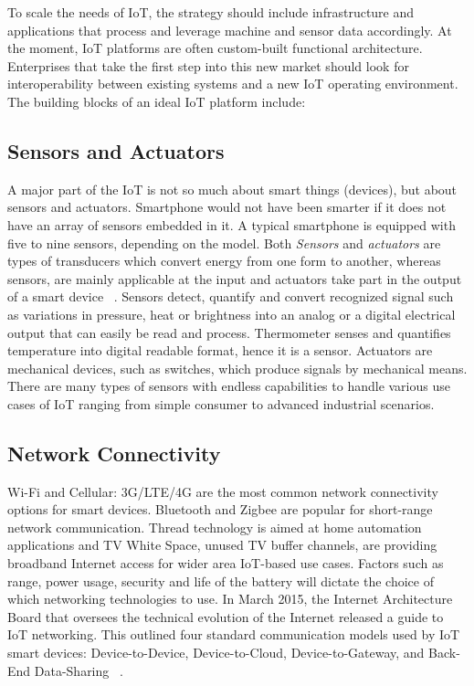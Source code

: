 \documentclass[sigconf]{acmart}
\begin{document}
	To scale the needs of IoT, the strategy should include infrastructure and applications that process and leverage machine and sensor data accordingly. At the moment, IoT platforms are often custom-built functional architecture. Enterprises that take the first step into this new market should look for interoperability between existing systems and a new IoT operating environment. The building blocks of an ideal IoT platform include:
	
	\subsection{Sensors and Actuators}
	A major part of the IoT is not so much about smart things (devices), but about sensors and actuators. Smartphone would not have been smarter if it does not have an array of sensors embedded in it. A typical smartphone is equipped with five to nine sensors, depending on the model. Both {\em Sensors} and  {\em actuators} are types of transducers which convert energy from one form to another, whereas sensors, are mainly applicable at the input and actuators take part in the output of a smart device ~\cite{wiley-book}. Sensors detect, quantify and convert recognized signal such as variations in pressure, heat or brightness into an analog or a digital electrical output that can easily be read and process. Thermometer senses and quantifies temperature into digital readable format, hence it is a sensor. Actuators are mechanical devices, such as switches, which produce signals by mechanical means. There are many types of sensors with endless capabilities to handle various use cases of IoT ranging from 
	simple consumer to advanced industrial scenarios.	
	
	
	\subsection{Network Connectivity}
	Wi-Fi and Cellular: 3G/LTE/4G are the most common network connectivity options for smart devices. Bluetooth and Zigbee are popular for short-range network communication. Thread technology is aimed at home automation applications and TV White Space, unused TV buffer channels, are providing broadband Internet access for wider area IoT-based use cases. Factors such as range, power usage, security and life of the battery will dictate the choice of which networking technologies to use. In March 2015, the Internet Architecture Board that oversees the technical evolution of the Internet released a guide to IoT networking. This outlined four standard communication models used by IoT smart devices: Device-to-Device, Device-to-Cloud, Device-to-Gateway, and Back-End Data-Sharing ~\cite{internet-society}.
	
\end{document}
